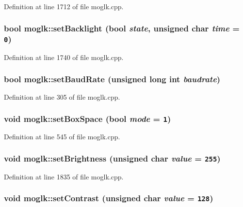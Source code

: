 Definition at line 1712 of file moglk.cpp.\hypertarget{classmoglk_d3b82640c34684aad6105f915ab874a4}{
\subsubsection[{setBacklight}]{\setlength{\rightskip}{0pt plus 5cm}bool moglk::setBacklight (bool {\em state}, \/  unsigned char {\em time} = {\tt 0})}}
\label{classmoglk_d3b82640c34684aad6105f915ab874a4}




Definition at line 1740 of file moglk.cpp.\hypertarget{classmoglk_788fca7601af41bd23d2f310ecc34100}{
\subsubsection[{setBaudRate}]{\setlength{\rightskip}{0pt plus 5cm}bool moglk::setBaudRate (unsigned long int {\em baudrate})}}
\label{classmoglk_788fca7601af41bd23d2f310ecc34100}




Definition at line 305 of file moglk.cpp.\hypertarget{classmoglk_ad564fea38cd80622152c152bfe62f4e}{
\subsubsection[{setBoxSpace}]{\setlength{\rightskip}{0pt plus 5cm}void moglk::setBoxSpace (bool {\em mode} = {\tt 1})}}
\label{classmoglk_ad564fea38cd80622152c152bfe62f4e}




Definition at line 545 of file moglk.cpp.\hypertarget{classmoglk_df864702b2368836b36a3888503e9040}{
\subsubsection[{setBrightness}]{\setlength{\rightskip}{0pt plus 5cm}void moglk::setBrightness (unsigned char {\em value} = {\tt 255})}}
\label{classmoglk_df864702b2368836b36a3888503e9040}




Definition at line 1835 of file moglk.cpp.\hypertarget{classmoglk_aef110fe43d65a957b0de17bde3b7436}{
\subsubsection[{setContrast}]{\setlength{\rightskip}{0pt plus 5cm}void moglk::setContrast (unsigned char {\em value} = {\tt 128})}}
\label{classmoglk_aef110fe43d65a957b0de17bde3b7436}




